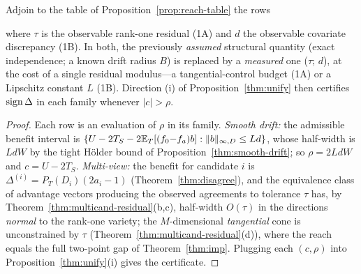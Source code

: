 \begin{proposition}\label{prop:reach-table-v05}
Adjoin to the table of Proposition~\ref{prop:reach-table} the rows
\begin{center}
\end{center}
where $\tau$ is the observable rank-one residual \textup{(1A)} and $d$ the
observable covariate discrepancy \textup{(1B)}. In both, the previously
\emph{assumed} structural quantity (exact independence; a known drift radius $B$)
is replaced by a \emph{measured} one ($\tau$; $d$), at the cost of a single
residual modulus---a tangential-control budget \textup{(1A)} or a Lipschitz
constant $L$ \textup{(1B)}. Direction (i) of Proposition~\ref{thm:unify} then
certifies $\operatorname{sign}\Delta$ in each family whenever $|c|>\rho$.
\end{proposition}
\begin{proof}
Each row is an evaluation of $\rho$ in its family. \emph{Smooth drift:} the
admissible benefit interval is $\{U-2T_S-2\mathbb{E}_T[(f_0{-}f_a)b]:\|b\|_{\infty,D}\le
Ld\}$, whose half-width is $LdW$ by the tight H\"older bound of
Proposition~\ref{thm:smooth-drift}; so $\rho=2LdW$ and $c=U-2T_S$. \emph{Multi-view:}
the benefit for candidate $i$ is $\Delta^{(i)}=P_T(D_i)(2a_i-1)$
(Theorem~\ref{thm:disagree}), and the equivalence class of advantage vectors
producing the observed agreements to tolerance $\tau$ has, by
Theorem~\ref{thm:multicand-residual}(b,c), half-width $O(\tau)$ in the directions
\emph{normal} to the rank-one variety; the $M$-dimensional \emph{tangential} cone
is unconstrained by $\tau$ (Theorem~\ref{thm:multicand-residual}(d)), where the
reach equals the full two-point gap of Theorem~\ref{thm:imp}. Plugging each
$(c,\rho)$ into Proposition~\ref{thm:unify}(i) gives the certificate. \qedhere
\end{proof}

